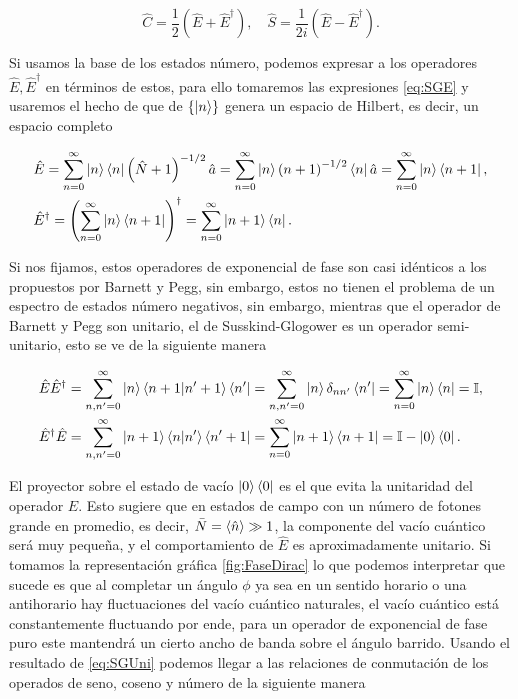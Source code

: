 	    \begin{equation}
	        \hat{C} = \frac{1}{2}\left( \hat{E}+\hat{E}^\dagger \right),\quad \hat{S}= \frac{1}{2i}\left( \hat{E}-\hat{E}^\dagger \right).
	    \end{equation}
	
	    Si usamos la base de los estados número, podemos expresar a los operadores $\hat{E},\hat{E}^\dagger$ en términos de estos, para ello tomaremos las expresiones \ref{eq:SGE} y usaremos el hecho de que de $\{\ket{n}\}$ genera un espacio de Hilbert, es decir, un espacio completo
	
	    \begin{align}\label{eq:SGNum}
	        & \hat{E} =  \sum_{n=0}^{\infty}   \ket{n} \bra{n} \left( \hat{N}+1 \right)^{-1/2}\hat{a} = \sum_{n=0}^\infty \ket{n} \left( n+1 \right)^{-1/2} \bra{n}\hat{a} = \sum_{n=0}^\infty \ket{n}\bra{n+1},\\
	        & \hat{E}^\dagger = \left(  \sum_{n=0}^\infty \ket{n}\bra{n+1}\right)^\dagger = \sum_{{n=0}}^\infty \ket{n+1}\bra{n}.
	    \end{align}
	
	    Si nos fijamos, estos operadores de exponencial de fase son casi idénticos a los propuestos por Barnett y Pegg, sin embargo, estos no tienen el problema de un espectro de estados número negativos, sin embargo, mientras que el operador de Barnett y Pegg son unitario, el de Susskind-Glogower es un operador semi-unitario, esto se ve de la siguiente manera
	
	    \begin{align}\label{eq:SGUni}
	        & \hat{E}\hat{E}^\dagger = \sum_{n,n'=0}^{\infty} \ket{n}\braket{n+1|n'+1}\bra{n'} = \sum_{n,n'=0}^\infty\ket{n}\delta_{nn'}\bra{n'} = \sum_{n=0}^\infty \ket{n}\bra{n}=\mathbb{I},\\
	        & \hat{E}^\dagger\hat{E} = \sum_{n,n'=0}^\infty \ket{n+1}\braket{n|n'}\bra{n'+1} = \sum_{n=0}^\infty \ket{n+1}\bra{n+1} = \mathbb{I}- \ket{0}\bra{0}.
	    \end{align}
	
	    El proyector sobre el estado de vacío $\ket{0}\bra{0}$ es el que evita la unitaridad del operador $\hat{E}$. Esto sugiere que en estados de campo con un número de fotones grande en promedio, es decir, $\bar{N} = \braket{\hat{n}}\gg  1$, la componente del vacío cuántico será muy pequeña, y el comportamiento de $\hat{E}$ es aproximadamente unitario. Si tomamos la representación gráfica \ref{fig:FaseDirac} lo que podemos interpretar que sucede es que al completar un ángulo $\phi$ ya sea en un sentido horario o una antihorario hay fluctuaciones del vacío cuántico naturales, el vacío cuántico está constantemente fluctuando por ende, para un operador de exponencial de fase puro este mantendrá un cierto ancho de banda sobre el ángulo barrido. Usando el resultado de \ref{eq:SGUni} podemos llegar a las relaciones de conmutación de los operados de seno, coseno y número de la siguiente manera
	
